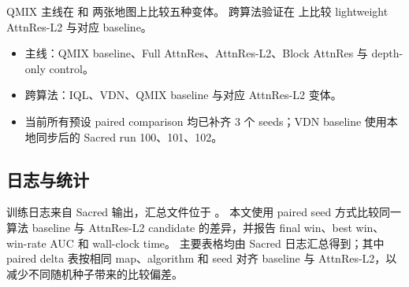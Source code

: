 QMIX 主线在  和  两张地图上比较五种变体。
跨算法验证在  上比较 lightweight AttnRes-L2 与对应 baseline。

\begin{itemize}
  \item 主线：QMIX baseline、Full AttnRes、AttnRes-L2、Block AttnRes 与 depth-only control。
  \item 跨算法：IQL、VDN、QMIX baseline 与对应 AttnRes-L2 变体。
  \item 当前所有预设 paired comparison 均已补齐 3 个 seeds；VDN baseline 使用本地同步后的 Sacred run 100、101、102。
\end{itemize}

\subsection{日志与统计}

训练日志来自 Sacred 输出，汇总文件位于 。
本文使用 paired seed 方式比较同一算法 baseline 与 AttnRes-L2 candidate 的差异，并报告 final win、best win、win-rate AUC 和 wall-clock time。
主要表格均由 Sacred 日志汇总得到；其中 paired delta 表按相同 map、algorithm 和 seed 对齐 baseline 与 AttnRes-L2，以减少不同随机种子带来的比较偏差。
